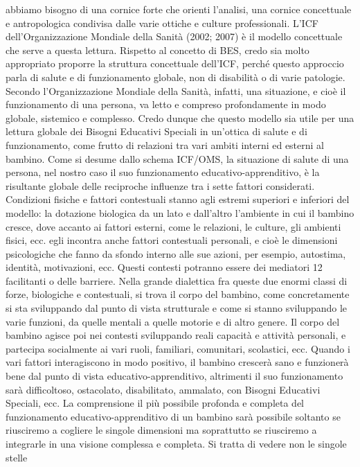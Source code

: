 abbiamo bisogno di una cornice forte che orienti l'analisi, una cornice concettuale e antropologica
condivisa dalle varie ottiche e culture professionali. L’ICF dell’Organizzazione Mondiale della Sanità
(2002; 2007) è il modello concettuale che serve a questa lettura.
Rispetto al concetto di BES, credo sia molto appropriato proporre la struttura concettuale
dell’ICF, perché questo approccio parla di salute e di funzionamento globale, non di disabilità o di
varie patologie. Secondo l’Organizzazione Mondiale della Sanità, infatti, una situazione, e cioè il
funzionamento di una persona, va letto e compreso profondamente in modo globale, sistemico e
complesso. Credo dunque che questo modello sia utile per una lettura globale dei Bisogni Educativi
Speciali in un’ottica di salute e di funzionamento, come frutto di relazioni tra vari ambiti interni ed
esterni al bambino.
Come si desume dallo schema ICF/OMS, la situazione di salute di una persona, nel nostro caso
il suo funzionamento educativo-apprenditivo, è la risultante globale delle reciproche influenze tra i
sette fattori considerati.
Condizioni fisiche e fattori contestuali stanno agli estremi superiori e inferiori del modello: la
dotazione biologica da un lato e dall’altro l’ambiente in cui il bambino cresce, dove accanto ai
fattori esterni, come le relazioni, le culture, gli ambienti fisici, ecc. egli incontra anche fattori
contestuali personali, e cioè le dimensioni psicologiche che fanno da sfondo interno alle sue azioni,
per esempio, autostima, identità, motivazioni, ecc. Questi contesti potranno essere dei mediatori
12
facilitanti o delle barriere.
Nella grande dialettica fra queste due enormi classi di forze, biologiche e contestuali, si trova il
corpo del bambino, come concretamente si sta sviluppando dal punto di vista strutturale e come si
stanno sviluppando le varie funzioni, da quelle mentali a quelle motorie e di altro genere.
Il corpo del bambino agisce poi nei contesti sviluppando reali capacità e attività personali, e
partecipa socialmente ai vari ruoli, familiari, comunitari, scolastici, ecc.
Quando i vari fattori interagiscono in modo positivo, il bambino crescerà sano e funzionerà
bene dal punto di vista educativo-apprenditivo, altrimenti il suo funzionamento sarà difficoltoso,
ostacolato, disabilitato, ammalato, con Bisogni Educativi Speciali, ecc.
La comprensione il più possibile profonda e completa del funzionamento educativo-apprenditivo di
un bambino sarà possibile soltanto se riusciremo a cogliere le singole dimensioni ma soprattutto se
riusciremo a integrarle in una visione complessa e completa. Si tratta di vedere non le singole stelle

